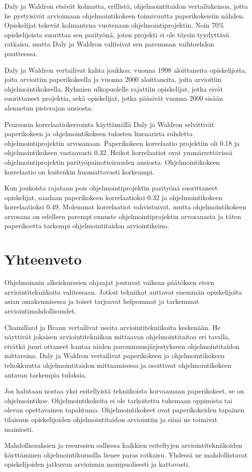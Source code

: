 \documentclass[finnish]{../tktltiki2}
\theoremstyle{definition}
\theoremstyle{remark}
\begin{document}
Daly ja Waldron etsivät kolmatta, erillistä, ohjelmointitaidon vertailukeinoa, jotta he pystyisivät arvioimaan ohjelmointikokeen toimivuutta paperikokeisiin nähden. Opiskelijat tekevät kolmantena vuotenaan ohjelmointiprojektin. Noin 70\% opiskelijoista suorittaa sen parityönä, joten projekti ei ole täysin tyydyttävä ratkaisu, mutta Daly ja Waldron valitsivat sen paremman vaihtoehdon puutteessa.

Daly ja Waldron vertailivat kahta joukkoa: vuonna 1998 aloittaneita opiskelijoita, joita arvioitiin paperikokeella ja vuonna 2000 aloittaneita, joita arvioitiin ohjelmointikokeella. Ryhmien ulkopuolelle rajattiin opiskelijat, jotka eivät suorittaneet projektia, sekä opiskelijat, jotka pääsivät vuonna 2000 sisään alennetun pisterajan ansiosta.

Pearsonin korrelaatiokerrointa käyttämällä Daly ja Waldron selvittivät paperikokeen ja ohjelmointikokeen tulosten lineaarista suhdetta ohjelmointiprojektin arvosanaan. Paperikokeen korrelaatio projektiin oli 0.18 ja ohjelmointikokeen vastaavasti 0.32. Heikot korrelaatiot ovat ymmärrettävissä ohjelmointiprojektin parityöpainotteisuuden ansiosta. Ohjelmointikokeen korrelaatio on kuitenkin huomattavasti korkeampi.

Kun joukoista rajataan pois ohjelmointiprojektin parityönä suorittaneet opiskelijat, saadaan paperikokeen korrelaatioksi 0.32 ja ohjelmointikokeen korrelaatioksi 0.49. Molemmat korrelaatiot vahvistuivat, mutta ohjelmointikokeen arvosana on edelleen parempi ennuste ohjelmointiprojektin arvosanasta ja täten paperikoetta tarkempi ohjelmointitaidon arviointikeino.

\section{Yhteenveto}

Ohjelmoinnin alkeiskurssien ohjaajat joutuvat vaikean päätöksen eteen arviointitekniikoita valitessaan. Jotkut tekniikat auttavat enemmän opiskelijoita asian omaksumisessa ja toiset tarjoavat helpommat ja tarkemmat arviointimahdollisuudet.

Chamillard ja Braun vertailivat useita arviointitekniikoita keskenään. He näyttivät jokaisen arviointitekniikan mittaavan ohjelmointitaitoa eri tavalla, eivätkä juuri ottaneet kantaa niiden paremmuusjärjestykseen ohjelmointitaidon mittareina. Daly ja Waldron vertailivat paperikokeen ja ohjelmointikokeen tehokkuutta ohjelmointitaidon mittaamisessa ja osoittivat ohjelmointikokeen antavan tarkempia tuloksia.

Jos halutaan nostaa yksi esitellyistä tekniikoista korvaamaan paperikokeet, se on ohjelmointikoe. Ohjelmointikokeita ei ole tarkoitettu tukemaan oppimista tai olevan opettavainen tapahtuma. Ohjelmointikokeet ovat paperikokeiden tapainen tilaisuus opiskelijoiden ohjelmointitaidon arviointiin ja siinä ne toimivat mainiosti.

Mahdollisuuksien ja resurssien salliessa kaikkien esiteltyjen arviointitekniikoiden käyttäminen ohjelmointikurssilla lienee paras ratkaisu. Yhdessä ne mahdollistavat opiskelijoiden jatkuvan arvioinnin  monipuolisesti ja kattavasti.





\end{document}
